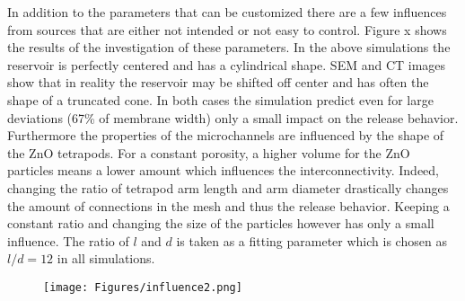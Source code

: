\documentclass{article}
\begin{document}
  In addition to the parameters that can be customized there are a few influences from sources that are either not intended or not easy to control. Figure x shows the results of the investigation of these parameters. In the above simulations the reservoir is perfectly centered and has a cylindrical shape. SEM and \textmu CT images show that in reality the reservoir may be shifted off center and has often the shape of a truncated cone. In both cases the simulation predict even for large deviations (67\% of membrane width) only a small impact on the release behavior. Furthermore the properties of the microchannels are influenced by the shape of the ZnO tetrapods. For a constant porosity, a higher volume for the ZnO particles means a lower amount which influences the interconnectivity. Indeed, changing the ratio of tetrapod arm length and arm diameter drastically changes the amount of connections in the mesh and thus the release behavior. Keeping a constant ratio and changing the size of the particles however has only a small influence. The ratio of $l$ and $d$ is taken as a fitting parameter which is chosen as $l/d=12$ in all simulations. 

  \begin{figure}[h!]
    \centering
    \texttt{[image: Figures/influence2.png]}
  \end{figure}

\end{document}
